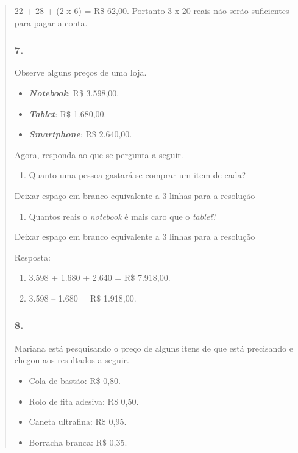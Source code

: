 \begin{enumerate}
\begin{escolha}
\begin{enumerate}
\begin{itemize}
\begin{itemize}
\begin{escolha}
\begin{quote}
\begin{escolha}
22 + 28 + (2 x 6) = R\$ 62,00.
Portanto 3 x 20 reais não serão suficientes para pagar a conta.

\subsubsection{7.}\label{section-71}

Observe alguns preços de uma loja.

\begin{itemize}
  \item \textbf{\textit{Notebook}}: R\$ 3.598,00.
  \item \textbf{\textit{Tablet}}: R\$ 1.680,00.
  \item \textbf{\textit{Smartphone}}: R\$ 2.640,00.
\end{itemize}

Agora, responda ao que se pergunta a seguir.

\begin{enumerate}
\def\labelenumi{\alph{enumi})}
\item
  Quanto uma pessoa gastará se comprar um item de cada?
\end{enumerate}

Deixar espaço em branco equivalente a 3 linhas para a resolução

\begin{enumerate}
\def\labelenumi{\alph{enumi})}
\item
  Quantos reais o \textit{notebook} é mais caro que o \textit{tablet}?
\end{enumerate}

Deixar espaço em branco equivalente a 3 linhas para a resolução

Resposta:

\begin{enumerate}
\def\labelenumi{\alph{enumi})}
\item
  3.598 + 1.680 + 2.640 = R\$ 7.918,00.
\item
  3.598 -- 1.680 = R\$ 1.918,00.
\end{enumerate}

\subsubsection{8.}\label{section-72}

Mariana está pesquisando o preço de alguns itens de que está precisando e chegou aos resultados a seguir.

\begin{itemize}
  \item Cola de bastão: R\$ 0,80.
  \item Rolo de fita adesiva: R\$ 0,50.
  \item Caneta ultrafina: R\$ 0,95.
  \item Borracha branca: R\$ 0,35.
\end{itemize}


\end{escolha}
\end{quote}
\end{escolha}
\end{itemize}
\end{itemize}
\end{enumerate}
\end{escolha}
\end{enumerate}
